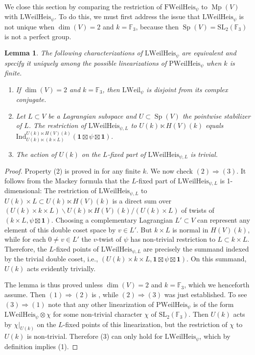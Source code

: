 \documentclass{article}
\def\F{\mathbb{F}}
\def\lmod{\backslash}
\DeclareMathOperator{\Sp}{Sp}
\newtheorem{lem}[thm]{Lemma}
\theoremstyle{definition}
\numberwithin{equation}{subsection}
\renewcommand{\-}{\hyp{}}
\DeclareMathOperator{\Mp}{Mp}
\begin{document}
\begin{appendices}
We close this section by comparing the restriction of $\mathrm{FWeilHeis}_\psi$ to $\Mp(V)$ with $\mathrm{LWeilHeis}_\psi$. To do this, we must first address the issue that $\mathrm{LWeilHeis}_\psi$ is not unique when $\dim(V)=2$ and $k=\F_3$, because then $\Sp(V)=\mathrm{SL}_2(\F_3)$ is not a perfect group.


\begin{lem} \label{lem:weilheisuniq}
	The following characterizations of $\mathrm{LWeilHeis}_\psi$ are equivalent and specify it uniquely among the possible linearizations of $\mathrm{PWeilHeis}_\psi$ when $k$ is finite.
	\begin{enumerate}
		\item If $\dim(V)=2$ and $k=\F_3$, then $\mathrm{LWeil}_\psi$ is disjoint from its complex conjugate.
		\item Let $L \subset V$ be a Lagrangian subspace and $U \subset \Sp(V)$ the pointwise stabilizer of $L$. The restriction of $\mathrm{LWeilHeis}_{\psi,L}$ to $U(k) \ltimes H(V)(k)$ equals $\mathrm{Ind}_{U(k) \ltimes (k \times L) }^{U(k) \ltimes H(V)(k)}(\mathbf{1} \boxtimes \psi \boxtimes  \mathbf{1})$.
		\item The action of $U(k)$ on the $L$-fixed part of $\mathrm{LWeilHeis}_{\psi,L}$ is trivial.
	\end{enumerate}
\end{lem}
\begin{proof}
	Property (2) is proved in \cite[Theorem 2.4(b)]{Gerardin} for any finite $k$. We now check $(2) \Rightarrow (3)$. It follows from the Mackey formula that the $L$-fixed part of $\mathrm{LWeilHeis}_{\psi,L}$ is 1-dimensional: The restriction of $\mathrm{LWeilHeis}_{\psi,L}$ to $U(k) \times L \subset U(k) \ltimes H(V)(k)$ is a direct sum over $(U(k) \times k \times L) \lmod U(k) \ltimes H(V)(k)/(U(k)\times L)$ of twists of $(k \times L,\psi\boxtimes \mathbf{1})$. Choosing a complementary Lagrangian $L' \subset V$ can represent any element of this double coset space by $v \in L'$.
	But $k \times L$ is normal in $H(V)(k)$, while for each $0 \neq v \in L'$ the $v$-twist of $\psi$ has non-trivial restriction to $L \subset k \times L$. Therefore, the $L$-fixed points of $\mathrm{LWeilHeis}_{\psi,L}$ are precisely the summand indexed by the trivial double coset, i.e., $(U(k) \times k \times L,\mathbf{1} \boxtimes \psi \boxtimes \mathbf{1})$. On this summand, $U(k)$ acts evidently trivially.

	The lemma is thus proved unless $\dim(V)=2$ and $k = \F_3$, which we henceforth assume. Then $(1) \Rightarrow (2)$ is \cite[Theorem 2.4(a,b)]{Gerardin}, while $(2) \Rightarrow (3)$ was just established. To see $(3) \Rightarrow (1)$ note that any other linearization of $\mathrm{PWeilHeis}_\psi$ is of the form $\mathrm{LWeilHeis}_\psi\otimes\chi$ for some non-trivial character $\chi$ of $\mathrm{SL}_2(\F_3)$. Then $U(k)$ acts by $\chi|_{U(k)}$ on the $L$-fixed points of this linearization, but the restriction of $\chi$ to $U(k)$ is non-trivial. Therefore (3) can only hold for $\mathrm{LWeilHeis}_\psi$, which by definition implies (1).
\end{proof}


\end{appendices}
\end{document}
